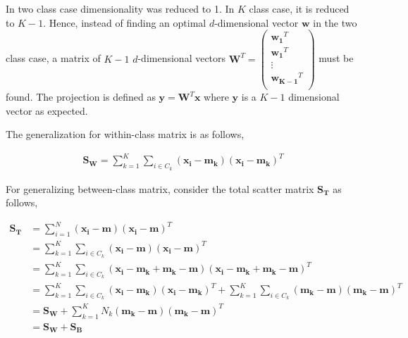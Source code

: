 \documentclass[11pt, a4paper]{article}
\begin{document}
In two class case dimensionality was reduced to 1. In $K$ class case, it is reduced to $K-1$. Hence, instead of finding an optimal $d$-dimensional vector $\boldsymbol{w}$ in the two class case, a matrix of $K-1$ $d$-dimensional vectors $\boldsymbol{W}^T = \begin{pmatrix}
\boldsymbol{w_1}^T \\
\boldsymbol{w_1}^T \\
\vdots \\
\boldsymbol{w_{K-1}}^T \\        
\end{pmatrix}$ must be found. The projection is defined as $\boldsymbol{y}=\boldsymbol{W}^T\boldsymbol{x}$ where $\boldsymbol{y}$ is a $K-1$ dimensional vector as expected.

The generalization for within-class matrix is as follows,

\begin{align*}
	\boldsymbol{S_W} = \sum_{k=1}^K \sum_{i \in C_k} (\boldsymbol{x_i} - \boldsymbol{m_k})(\boldsymbol{x_i} - \boldsymbol{m_k})^T 
\end{align*}
 
For generalizing between-class matrix, consider the total scatter matrix $\boldsymbol{S_T}$ as follows,

\begin{align*}
	\boldsymbol{S_T} & = \sum_{i=1}^N (\boldsymbol{x_i} - \boldsymbol{m})(\boldsymbol{x_i} - \boldsymbol{m})^T                                                                                                                               \\
	                 & = \sum_{k=1}^K \sum_{i \in C_k} (\boldsymbol{x_i} - \boldsymbol{m})(\boldsymbol{x_i} - \boldsymbol{m})^T                                                                                                              \\
	                 & = \sum_{k=1}^K \sum_{i \in C_k} (\boldsymbol{x_i} - \boldsymbol{m_k} + \boldsymbol{m_k} - \boldsymbol{m})(\boldsymbol{x_i} - \boldsymbol{m_k} + \boldsymbol{m_k} - \boldsymbol{m})^T                                  \\
	                 & = \sum_{k=1}^K \sum_{i \in C_k} (\boldsymbol{x_i} - \boldsymbol{m_k})(\boldsymbol{x_i} - \boldsymbol{m_k})^T + \sum_{k=1}^K \sum_{i \in C_k} (\boldsymbol{m_k} - \boldsymbol{m})(\boldsymbol{m_k} - \boldsymbol{m})^T \\
	                 & = \boldsymbol{S_W} + \sum_{k=1}^K N_k(\boldsymbol{m_k} - \boldsymbol{m})(\boldsymbol{m_k} - \boldsymbol{m})^T                                                                                                         \\
	                 & = \boldsymbol{S_W} + \boldsymbol{S_B}                                                                                                                                                                                 
\end{align*} 
\end{document}
